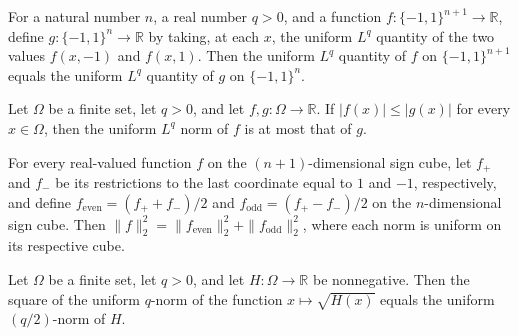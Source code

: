 \begin{theorem}
\label{FABL.uniformLpNorm_eq_lastFiberLpNorm}
\leanok
{}
For a natural number $n$, a real number $q>0$, and a function
$f:\{-1,1\}^{n+1}\to\mathbb{R}$, define $g:\{-1,1\}^{n}\to\mathbb{R}$ by taking, at each
$x$, the uniform $L^q$ quantity of the two values $f(x,-1)$ and $f(x,1)$. Then the
uniform $L^q$ quantity of $f$ on $\{-1,1\}^{n+1}$ equals the uniform $L^q$ quantity of
$g$ on $\{-1,1\}^{n}$.
\end{theorem}

\begin{theorem}
\label{FABL.uniformLpNorm_le_of_abs_le}
\leanok
{}
Let $\Omega$ be a finite set, let $q>0$, and let $f,g:\Omega\to\mathbb R$. If
$|f(x)|\le |g(x)|$ for every $x\in\Omega$, then the uniform $L^q$ norm of $f$ is at
most that of $g$.
\end{theorem}

\begin{theorem}
\label{FABL.uniformLpNorm_two_lastParts_sq}
\leanok
{}
For every real-valued function $f$ on the $(n+1)$-dimensional sign cube, let $f_+$ and
$f_-$ be its restrictions to the last coordinate equal to $1$ and $-1$, respectively,
and define $f_{\mathrm{even}}=(f_++f_-)/2$ and $f_{\mathrm{odd}}=(f_+-f_-)/2$ on the
$n$-dimensional sign cube. Then
$\|f\|_2^2=\|f_{\mathrm{even}}\|_2^2+\|f_{\mathrm{odd}}\|_2^2$, where each norm is
uniform on its respective cube.
\end{theorem}

\begin{theorem}
\label{FABL.uniformLpNorm_sqrt_sq}
\leanok
{}
Let $\Omega$ be a finite set, let $q>0$, and let $H:\Omega\to\mathbb{R}$ be nonnegative.
Then the square of the uniform $q$-norm of the function $x\mapsto\sqrt{H(x)}$ equals the
uniform $(q/2)$-norm of $H$.
\end{theorem}

